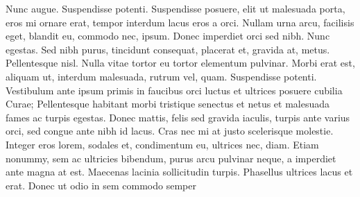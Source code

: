 ﻿\documentclass{article}
\begin{document}
Nunc augue. Suspendisse potenti. Suspendisse posuere, elit ut malesuada porta,
eros mi ornare erat, tempor interdum lacus eros a orci. Nullam urna arcu,
facilisis eget, blandit eu, commodo nec, ipsum. Donec imperdiet orci sed nibh.
Nunc egestas. Sed nibh purus, tincidunt consequat, placerat et, gravida at,
metus. Pellentesque nisl. Nulla vitae tortor eu tortor elementum pulvinar. Morbi
erat est, aliquam ut, interdum malesuada, rutrum vel, quam. Suspendisse potenti.
Vestibulum ante ipsum primis in faucibus orci luctus et ultrices posuere cubilia
Curae; Pellentesque habitant morbi tristique senectus et netus et malesuada
fames ac turpis egestas. Donec mattis, felis sed gravida iaculis, turpis ante
varius orci, sed congue ante nibh id lacus. Cras nec mi at justo scelerisque
molestie. Integer eros lorem, sodales et, condimentum eu, ultrices nec, diam.
Etiam nonummy, sem ac ultricies bibendum, purus arcu pulvinar neque, a imperdiet
ante magna at est. Maecenas lacinia sollicitudin turpis. Phasellus ultrices
lacus et erat. Donec ut odio in sem commodo semper

\theendnotes
\end{document}
